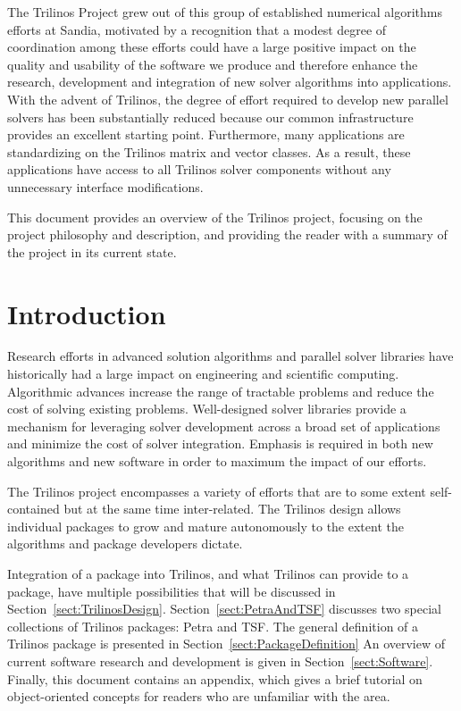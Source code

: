 \documentclass[12pt,relax]{TrilinosOverview}
\begin{document}
The Trilinos Project grew out of this group of established numerical algorithms
efforts at Sandia, motivated by  a recognition that a modest degree of 
coordination among these efforts could have a large positive impact on 
the quality and usability of the software we produce and therefore enhance the
research, development and integration of new solver algorithms into
applications.  With the advent of Trilinos, the degree of effort required 
to develop new parallel solvers has been 
substantially reduced because our common infrastructure provides an excellent 
starting point.  Furthermore, many applications are standardizing on the 
Trilinos matrix and vector classes.  As a result, these applications
have access to all Trilinos solver components without any unnecessary 
interface modifications.

This document provides an overview of the Trilinos project,
focusing on the project philosophy and description, and
providing the reader with a summary of the project in its current state.  

\section{Introduction}

Research efforts in advanced solution algorithms and parallel solver
libraries have historically had a large impact on engineering and
scientific computing.  Algorithmic advances increase the range
of tractable problems and reduce the cost of solving existing
problems.  Well-designed solver libraries provide a mechanism for
leveraging solver development across a broad set of applications and
minimize the cost of solver integration.  Emphasis is
required in both new algorithms and new software in order
to maximum the impact of our efforts.

The Trilinos project encompasses a variety of efforts that are to some
extent self-contained but at the same time inter-related.  The
Trilinos design allows individual packages to grow and mature
autonomously to the extent the algorithms and package developers
dictate. 

Integration of a package into Trilinos, and what Trilinos can provide
to a package, have multiple possibilities
that will be discussed in Section~\ref{sect:TrilinosDesign}.
Section~\ref{sect:PetraAndTSF} discusses two special collections of Trilinos
packages: Petra and TSF.  The general definition of a Trilinos
package is presented in Section~\ref{sect:PackageDefinition}
An overview of current software research and
development is given in Section~\ref{sect:Software}.  
Finally, this document contains
an appendix, which gives a brief
tutorial on object-oriented concepts for readers who are unfamiliar
with the area.  
\end{document}
